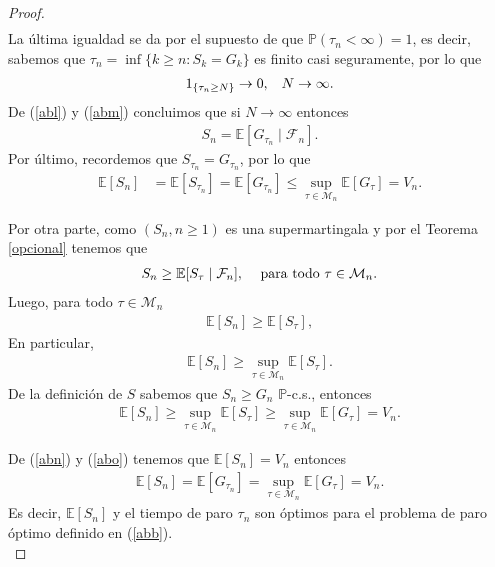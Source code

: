 \begin{proof}
\begin{align}
	\end{align}
La última igualdad se da por el supuesto de que $\mathbb{P}(\tau_n < \infty) = 1$, es decir, sabemos que $\tau_n = \inf \{k \geq n : S_k = G_k \}$ es finito casi seguramente, por lo que
	\begin{align*}
	1_{ \{ \tau_n \geq N \} } \rightarrow 0, \hspace{0.3cm} N \rightarrow \infty.
	\end{align*}
De (\ref{abl}) y (\ref{abm}) concluimos que si $N \rightarrow \infty$ entonces
	\begin{align*}
	S_n = \mathbb{E}[G_{\tau_n} \mid \mathcal{F}_n].
	\end{align*}
Por último, recordemos que $S_{\tau_n} = G_{\tau_n}$, por lo que
	\begin{align}
	\mathbb{E}[S_n] & = \mathbb{E}[S_{\tau_n}] = \mathbb{E}[G_{\tau_n}] \leq \sup_{\tau \in \mathcal{M}_n} \mathbb{E}[G_{\tau}] = V_n. \label{abn}
	\end{align}

Por otra parte, como $(S_n, n \geq 1)$ es una supermartingala y por el Teorema \ref{opcional} tenemos que
	\begin{align*}
	S_n \geq \mathbb{E}[S_\tau \mid \mathcal{F}_n], \hspace{0.3cm} \text{ para todo } \tau \in \mathcal{M}_n.
	\end{align*}
Luego, para todo $\tau \in \mathcal{M}_n$
	\begin{align*}
	\mathbb{E}[S_n] \geq \mathbb{E}[S_\tau],
	\end{align*}
En particular, 
	\begin{align*}
	\mathbb{E}[S_n] \geq \sup_{\tau \in \mathcal{M}_n} \mathbb{E}[S_\tau ].
	\end{align*}
De la definición de $S$ sabemos que $S_n \geq G_n$ $\mathbb{P}$-c.s., entonces
	\begin{align}
	\mathbb{E}[S_n] \geq \sup_{\tau \in \mathcal{M}_n}\mathbb{E}[S_\tau] \geq \sup_{\tau \in \mathcal{M}_n}\mathbb{E}[G_\tau] = V_n. \label{abo}
	\end{align}

De (\ref{abn}) y (\ref{abo}) tenemos que $\mathbb{E}[S_n] = V_n$ entonces
\begin{align*}
\mathbb{E}[S_n] = \mathbb{E}[G_{\tau_n}] = \sup_{\tau \in \mathcal{M}_n}\mathbb{E}[G_\tau] = V_n.
\end{align*}
Es decir, $\mathbb{E}[S_n]$ y el tiempo de paro $\tau_n$ son óptimos para el problema de paro óptimo definido en (\ref{abb}). \\


\end{proof}
